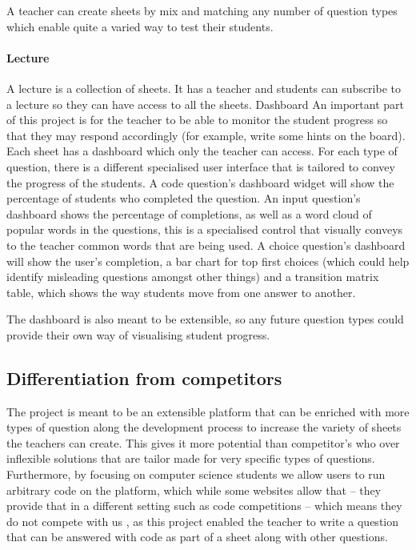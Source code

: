 \documentclass[12pt]{article}
\begin{document}
A teacher can create sheets by mix and matching any number of question types which enable quite a varied way to test their students.

\paragraph{Lecture}
A lecture is a collection of sheets. It has a teacher and students can subscribe to a lecture so they can have access to all the sheets.
Dashboard
An important part of this project is for the teacher to be able to monitor the student progress so that they may respond accordingly (for example, write some hints on the board). Each sheet has a dashboard which only the teacher can access.
For each type of question, there is a different specialised user interface that is tailored to convey the progress of the students.
A code question's dashboard widget will show the percentage of students who completed the question. 
An input question’s dashboard shows the percentage of completions, as well as a word cloud of popular words in the questions, this is a specialised control that visually conveys to the teacher common words that are being used.
A choice question’s dashboard will show the user’s completion, a bar chart for top first choices (which could help identify misleading questions amongst other things) and a transition matrix table, which shows the way students move from one answer to another.

The dashboard is also meant to be extensible, so any future question types could provide their own way of visualising student progress.

\subsection{Differentiation from competitors}
The project is meant to be an extensible platform that can be enriched with more types of question along the development process to increase the variety of sheets the teachers can create. This gives it more potential than competitor’s who over inflexible solutions that are tailor made for very specific types of questions.
Furthermore, by focusing on computer science students we allow users to run arbitrary code on the platform, which while some websites allow that – they provide that in a different setting such as code competitions – which means they do not compete with us , as this project enabled the teacher to write a question that can be answered with code as part of a sheet along with other questions.
\end{document}
